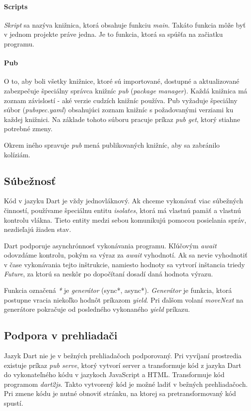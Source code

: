 \paragraph{Scripts}
\emph{Skript} sa nazýva knižnica, ktorá obsahuje funkciu \emph{main}. Takáto funkcia môže byť v jednom projekte práve jedna. Je to funkcia, ktorá sa spúšťa na začiatku programu.

\paragraph{Pub}
O to, aby boli všetky knižnice, ktoré sú importované, dostupné a aktualizované zabezpečuje špeciálny správca knižníc \emph{pub} (\emph{package manager}). 
Každá knižnica má zoznam závislostí - aké verzie cudzích knižníc používa. 
Pub vyžaduje špeciálny súbor (\emph{pubspec.yaml}) obsahujúci zoznam knižníc s požadovanými verziami ku každej knižnici. Na základe tohoto súboru pracuje príkaz \emph{pub get}, ktorý stiahne potrebné zmeny.

Okrem iného spravuje \emph{pub} mená publikovaných knižníc, aby sa zabránilo kolíziám.

\subsection{Súbežnosť}%
Kód v jazyku Dart je vždy jednovláknový. Ak chceme vykonávať viac súbežných činností, používame špeciálnu entitu \emph{isolates}, ktorá má vlastnú pamäť a vlastnú kontrolu vlákna. Tieto entity medzi sebou komunikujú pomocou posielania správ, nezdieľajú žiaden stav.

Dart podporuje asynchrónnosť vykonávania programu. Kľúčovým \emph{await} odovzdáme kontrolu, pokým sa výraz za \emph{await} vyhodnotí. Ak sa nevie vyhodnotiť v čase vykonávania tejto inštrukcie, namiesto hodnoty sa vytvorí inštancia triedy \emph{Future}, za ktorú sa neskôr po dopočítaní dosadí daná hodnota výrazu.%

\NEW{}
Funkcia označená \emph{*} je \emph{generátor} (sync*, async*). \emph{Generátor} je funkcia, ktorá postupne vracia niekoľko hodnôt príkazom \emph{yield}. Pri ďalšom volaní \emph{moveNext} na generátore pokračuje od posledného vykonaného \emph{yield} príkazu.

\subsection{Podpora v prehliadači} \NEW{}
Jazyk Dart nie je v bežných prehliadačoch podporovaný. Pri vyvíjaní prostredia existuje príkaz \emph{pub serve}, ktorý vytvorí server a transformuje kód z jazyka Dart do vykonateľného kódu v jazykoch JavaScript a HTML. Transformuje kód programom \emph{dart2js}. Takto vytvorený kód je možné ladiť v bežných prehliadačoch. Pri zmene kódu je nutné obnoviť stránku, na ktorej sa pretransformovaný kód spustí.

